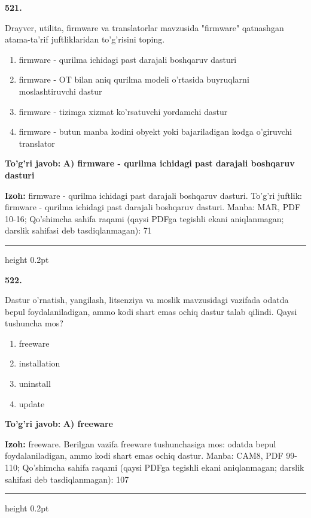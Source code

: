 \documentclass[10pt,a4paper]{article}
\begin{document}
{\bfseries\sffamily\color{ink} 521.}
\par
Drayver, utilita, firmware va translatorlar mavzusida "firmware" qatnashgan atama-ta'rif juftliklaridan to'g'risini toping.
\begin{enumerate}[label=\Alph*),leftmargin=9mm]
\item firmware - qurilma ichidagi past darajali boshqaruv dasturi
\item firmware - OT bilan aniq qurilma modeli o'rtasida buyruqlarni moslashtiruvchi dastur
\item firmware - tizimga xizmat ko'rsatuvchi yordamchi dastur
\item firmware - butun manba kodini obyekt yoki bajariladigan kodga o'giruvchi translator
\end{enumerate}
\begin{tcolorbox}[enhanced,breakable,colback=teal!4,colframe=teal!60!black,boxrule=0.45pt,arc=1.2mm,left=2.7mm,right=2.7mm,top=1.8mm,bottom=1.8mm,before skip=2mm,after skip=2mm]
{\bfseries\sffamily\color{teal}To'g'ri javob:} \textbf{A) firmware - qurilma ichidagi past darajali boshqaruv dasturi}
\par\smallskip
{\bfseries Izoh:} firmware - qurilma ichidagi past darajali boshqaruv dasturi. To'g'ri juftlik: firmware - qurilma ichidagi past darajali boshqaruv dasturi. Manba: MAR, PDF 10-16; Qo'shimcha sahifa raqami (qaysi PDFga tegishli ekani aniqlanmagan; darslik sahifasi deb tasdiqlanmagan): 71
\end{tcolorbox}
\vspace{2mm}\hrule height 0.2pt\vspace{3mm}

{\bfseries\sffamily\color{ink} 522.}
\par
Dastur o'rnatish, yangilash, litsenziya va moslik mavzusidagi vazifada odatda bepul foydalaniladigan, ammo kodi shart emas ochiq dastur talab qilindi. Qaysi tushuncha mos?
\begin{enumerate}[label=\Alph*),leftmargin=9mm]
\item freeware
\item installation
\item uninstall
\item update
\end{enumerate}
\begin{tcolorbox}[enhanced,breakable,colback=teal!4,colframe=teal!60!black,boxrule=0.45pt,arc=1.2mm,left=2.7mm,right=2.7mm,top=1.8mm,bottom=1.8mm,before skip=2mm,after skip=2mm]
{\bfseries\sffamily\color{teal}To'g'ri javob:} \textbf{A) freeware}
\par\smallskip
{\bfseries Izoh:} freeware. Berilgan vazifa freeware tushunchasiga mos: odatda bepul foydalaniladigan, ammo kodi shart emas ochiq dastur. Manba: CAM8, PDF 99-110; Qo'shimcha sahifa raqami (qaysi PDFga tegishli ekani aniqlanmagan; darslik sahifasi deb tasdiqlanmagan): 107
\end{tcolorbox}
\vspace{2mm}\hrule height 0.2pt\vspace{3mm}
\end{document}
